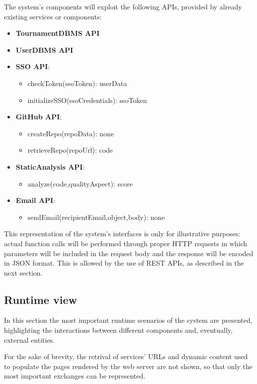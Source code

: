 The system's components will exploit the following APIs, provided by already existing services or components:
\begin{itemize}
    \item \textbf{TournamentDBMS API}
    \item \textbf{UserDBMS API}
    \item \textbf{SSO API}:
    \begin{itemize}
        \item checkToken(ssoToken): userData
        \item initializeSSO(ssoCredentials): ssoToken
    \end{itemize}
    \item \textbf{GitHub API}: 
    \begin{itemize}
        \item createRepo(repoData): none
        \item retrieveRepo(repoUrl): code
    \end{itemize}
    \item \textbf{StaticAnalysis API}: 
    \begin{itemize}
        \item analyze(code,qualityAspect): score
    \end{itemize}
    \item \textbf{Email API}:
    \begin{itemize}
        \item sendEmail(recipientEmail,object,body): none
    \end{itemize}
\end{itemize}
This representation of the system's interfaces is only for illustrative purposes: actual function calls will be performed through proper HTTP requests in which parameters will be included in the request body and the response will be encoded in JSON format. This is allowed by the use of REST APIs, as described in the next section.

\newpage
\subsection{Runtime view}
In this section the most important runtime scenarios of the system are presented, highlighting the interactions between different components and, eventually, external entities.

For the sake of brevity, the retrival of services' URLs and dynamic content used to populate the pages rendered by the web server are not shown, so that only the most important exchanges can be represented.

